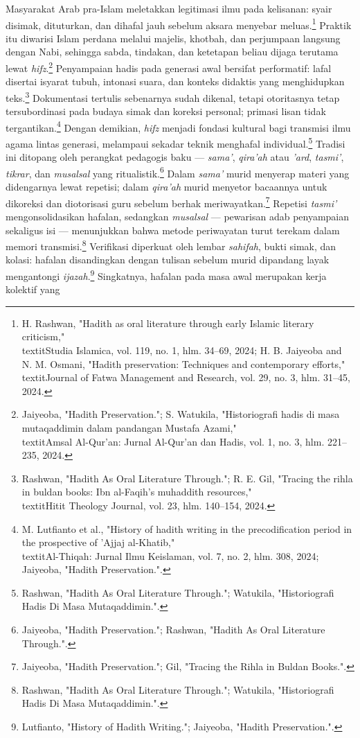 Masyarakat Arab pra-Islam meletakkan legitimasi ilmu pada kelisanan: syair disimak, dituturkan, dan dihafal jauh sebelum aksara menyebar meluas.\footnote{H. Rashwan, "Hadith as oral literature through early Islamic literary criticism," \\textit{Studia Islamica}, vol. 119, no. 1, hlm. 34--69, 2024; H. B. Jaiyeoba and N. M. Osmani, "Hadith preservation: Techniques and contemporary efforts," \\textit{Journal of Fatwa Management and Research}, vol. 29, no. 3, hlm. 31--45, 2024.} Praktik itu diwarisi Islam perdana melalui majelis, khotbah, dan perjumpaan langsung dengan Nabi, sehingga sabda, tindakan, dan ketetapan beliau dijaga terutama lewat \textit{hifz}.\footnote{Jaiyeoba, "Hadith Preservation."; S. Watukila, "Historiografi hadis di masa mutaqaddimin dalam pandangan Mustafa Azami," \\textit{Amsal Al-Qur'an: Jurnal Al-Qur'an dan Hadis}, vol. 1, no. 3, hlm. 221--235, 2024.} Penyampaian hadis pada generasi awal bersifat performatif: lafal disertai isyarat tubuh, intonasi suara, dan konteks didaktis yang menghidupkan teks.\footnote{Rashwan, "Hadith As Oral Literature Through."; R. E. Gil, "Tracing the rihla in buldan books: Ibn al-Faqih's muhaddith resources," \\textit{Hitit Theology Journal}, vol. 23, hlm. 140--154, 2024.} Dokumentasi tertulis sebenarnya sudah dikenal, tetapi otoritasnya tetap tersubordinasi pada budaya simak dan koreksi personal; primasi lisan tidak tergantikan.\footnote{M. Lutfianto et al., "History of hadith writing in the precodification period in the prospective of 'Ajjaj al-Khatib," \\textit{Al-Thiqah: Jurnal Ilmu Keislaman}, vol. 7, no. 2, hlm. 308, 2024; Jaiyeoba, "Hadith Preservation.".} Dengan demikian, \textit{hifz} menjadi fondasi kultural bagi transmisi ilmu agama lintas generasi, melampaui sekadar teknik menghafal individual.\footnote{Rashwan, "Hadith As Oral Literature Through."; Watukila, "Historiografi Hadis Di Masa Mutaqaddimin.".} Tradisi ini ditopang oleh perangkat pedagogis baku --- \textit{sama'}, \textit{qira'ah} atau \textit{'ard}, \textit{tasmi'}, \textit{tikrar}, dan \textit{musalsal} yang ritualistik.\footnote{Jaiyeoba, "Hadith Preservation."; Rashwan, "Hadith As Oral Literature Through.".} Dalam \textit{sama'} murid menyerap materi yang didengarnya lewat repetisi; dalam \textit{qira'ah} murid menyetor bacaannya untuk dikoreksi dan diotorisasi guru sebelum berhak meriwayatkan.\footnote{Jaiyeoba, "Hadith Preservation."; Gil, "Tracing the Rihla in Buldan Books.".} Repetisi \textit{tasmi'} mengonsolidasikan hafalan, sedangkan \textit{musalsal} --- pewarisan adab penyampaian sekaligus isi --- menunjukkan bahwa metode periwayatan turut terekam dalam memori transmisi.\footnote{Rashwan, "Hadith As Oral Literature Through."; Watukila, "Historiografi Hadis Di Masa Mutaqaddimin.".} Verifikasi diperkuat oleh lembar \textit{sahifah}, bukti simak, dan kolasi: hafalan disandingkan dengan tulisan sebelum murid dipandang layak mengantongi \textit{ijazah}.\footnote{Lutfianto, "History of Hadith Writing."; Jaiyeoba, "Hadith Preservation.".} Singkatnya, hafalan pada masa awal merupakan kerja kolektif yang 